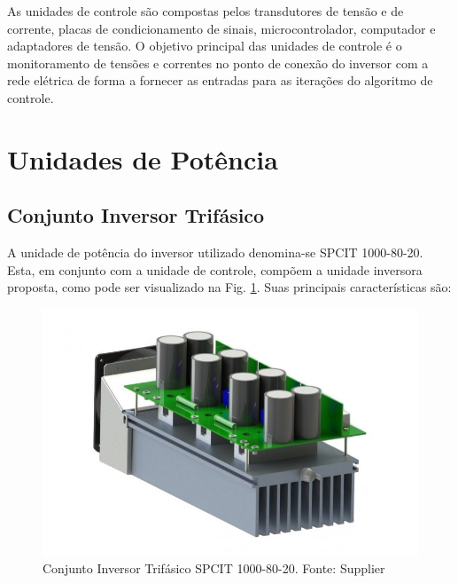 As unidades de controle são compostas pelos transdutores de tensão e de corrente, placas de condicionamento de sinais, microcontrolador, computador e adaptadores de tensão. 
O objetivo principal das unidades de controle é o monitoramento de tensões e correntes no ponto de conexão do inversor com a rede elétrica de forma a fornecer as entradas para as iterações do algoritmo de controle.

\section{Unidades de Potência}

\subsection{Conjunto Inversor Trifásico}

A unidade de potência do inversor utilizado denomina-se SPCIT 1000-80-20. Esta, em conjunto com a unidade de controle, compõem a unidade inversora proposta, como pode ser visualizado na Fig. \ref{fig:conjunto-inversor}.
Suas principais características são:

\begin{figure}[!hbt]
	\begin{center}
    \includegraphics[scale=0.3]{figuras/conjunto_inversor_trifasico.jpg}
    \caption{Conjunto Inversor Trifásico SPCIT 1000-80-20. Fonte: Supplier}
    \label{fig:conjunto-inversor}
    \end{center}
\end{figure}

